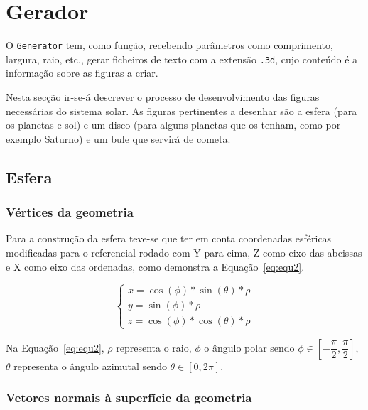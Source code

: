 \section{Gerador}

O \texttt{Generator} tem, como função, recebendo parâmetros como comprimento,
largura, raio, etc., gerar ficheiros de texto com a extensão \verb|.3d|, cujo conteúdo
é a informação sobre as figuras a criar. 

Nesta secção ir-se-á descrever o processo de desenvolvimento das figuras
necessárias do sistema solar. As figuras pertinentes a desenhar são a esfera
(para os planetas e sol) e um disco (para alguns planetas que os tenham, como
por exemplo Saturno) e um bule que servirá de cometa. 



\subsection{Esfera}
\subsubsection{Vértices da geometria}
Para a construção da esfera teve-se que ter em conta coordenadas esféricas
modificadas para o referencial rodado com Y para cima, Z como eixo das abcissas
e X como eixo das ordenadas, como demonstra a Equação~\ref{eq:equ2}.


\begin{equation}
    \begin{cases}
    x = \cos(\phi) * \sin(\theta) * \rho \\
    y = \sin(\phi) * \rho \\
    z = \cos(\phi) * \cos(\theta) *\rho
    \end{cases}
\label{eq:equ2}
\end{equation}

Na Equação~\ref{eq:equ2}, $\rho$ representa o raio, $\phi$ o ângulo polar sendo
$\phi \in [-\dfrac{\pi}{2}, \dfrac{\pi}{2}]$, $\theta$ representa o ângulo
azimutal sendo $\theta \in [0, 2\pi]$. 

\subsubsection{Vetores normais à superfície da geometria}

